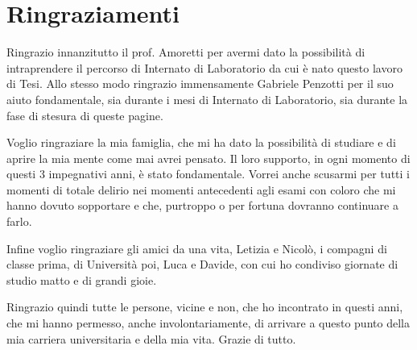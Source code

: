 \chapter*{Ringraziamenti}

Ringrazio innanzitutto il prof. Amoretti per avermi dato la possibilità di intraprendere il percorso di Internato di Laboratorio da cui è nato questo lavoro di Tesi. Allo stesso modo ringrazio immensamente Gabriele Penzotti per il suo aiuto fondamentale, sia durante i mesi di Internato di Laboratorio, sia durante la fase di stesura di queste pagine.

Voglio ringraziare la mia famiglia, che mi ha dato la possibilità di studiare e di aprire la mia mente come mai avrei pensato. Il loro supporto, in ogni momento di questi 3 impegnativi anni, è stato fondamentale. Vorrei anche scusarmi per tutti i momenti di totale delirio nei momenti antecedenti agli esami con coloro che mi hanno dovuto sopportare e che, purtroppo o per fortuna dovranno continuare a farlo.

Infine voglio ringraziare gli amici da una vita, Letizia e Nicolò, i compagni di classe prima, di Università poi, Luca e Davide, con cui ho condiviso giornate di studio matto e di grandi gioie. 

Ringrazio quindi tutte le persone, vicine e non, che ho incontrato in questi anni, che mi hanno permesso, anche involontariamente, di arrivare a questo punto della mia carriera universitaria e della mia vita. Grazie di tutto.
